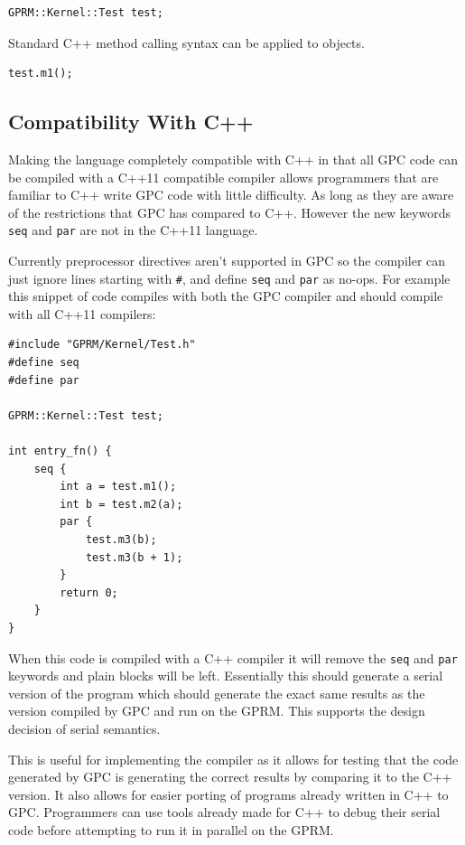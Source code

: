 \begin{lstlisting}[style=myGPC]
GPRM::Kernel::Test test;
\end{lstlisting}

Standard C++ method calling syntax can be applied to objects.
\begin{lstlisting}[style=myGPC]
test.m1();
\end{lstlisting}



\subsection{Compatibility With C++}
Making the language completely compatible with C++ in that all GPC code can be
compiled with a C++11 compatible compiler allows programmers that are familiar to
C++ write GPC code with little difficulty. As long as they are aware of the restrictions
that GPC has compared to C++. However the new keywords \texttt{seq} and \texttt{par} are not 
in the C++11 language.

Currently preprocessor directives aren't supported in GPC so the compiler can
just ignore lines starting with \texttt{\#}, and define \texttt{seq} and \texttt{par} as no-ops. 
For example this snippet of code compiles with both the GPC compiler and 
should compile with all C++11 compilers:

\begin{lstlisting}[style=myGPC]
#include "GPRM/Kernel/Test.h"
#define seq
#define par

GPRM::Kernel::Test test;

int entry_fn() {
    seq {
        int a = test.m1();
        int b = test.m2(a);        
        par {
            test.m3(b);
            test.m3(b + 1);
        }
        return 0;
    }
}
\end{lstlisting}

When this code is compiled with a C++ compiler it will remove the \texttt{seq} and \texttt{par}
keywords and plain blocks will be left. Essentially this should generate a
serial version of the program which should generate the exact same results
as the version compiled by GPC and run on the GPRM. This supports the 
design decision of serial semantics.

This is useful for implementing the compiler as it allows for
testing that the code generated by GPC is generating the correct results
by comparing it to the C++ version. It also allows for easier porting of
programs already written in C++ to GPC. Programmers can use tools
already made for C++ to debug their serial code before attempting
to run it in parallel on the GPRM.

